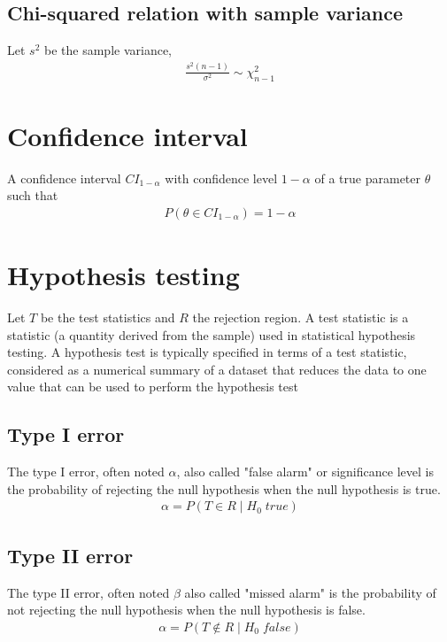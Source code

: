 \documentclass[../main.tex]{subfiles}
\begin{document}
\subsection{Chi-squared relation with sample variance}
Let $s^2$ be the sample variance,
\begin{align*}
    \frac{s^2(n-1)}{\sigma^2} \sim \chi_{n-1}^2
\end{align*}

\section{Confidence interval}
A confidence interval $CI_{1-\alpha}$ with confidence level $1-\alpha$ of a true parameter $\theta$
such that
\begin{align*}
    P(\theta \in CI_{1-\alpha}) = 1 - \alpha
\end{align*}

\section{Hypothesis testing}
Let $T$ be the test statistics and $R$ the rejection region.
A test statistic is a statistic (a quantity derived from the sample) used in statistical hypothesis testing.
A hypothesis test is typically specified in terms of a test statistic, considered as a numerical summary
of a dataset that reduces the data to one value that can be used to perform the hypothesis test

\subsection{Type I error}
The type I error, often noted $\alpha$, also called "false alarm" or significance level is the probability
of rejecting the null hypothesis when the null hypothesis is true.
\begin{align*}
    \alpha = P(T \in R\; |\; H_0\; true)
\end{align*}

\subsection{Type II error}
The type II error, often noted $\beta$ also called "missed alarm" is the probability
of not rejecting the null hypothesis when the null hypothesis is false.
\begin{align*}
    \alpha = P(T \notin R\; |\; H_0\; false)
\end{align*}
\end{document}
